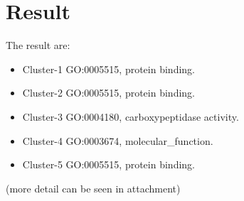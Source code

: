 \section{Result}

The result are:
\begin{itemize}
	\item Cluster-1 GO:0005515, protein binding.
	\item Cluster-2 GO:0005515, protein binding.
	\item Cluster-3 GO:0004180, carboxypeptidase activity.
	\item Cluster-4 GO:0003674, molecular\_function.
	\item Cluster-5 GO:0005515, protein binding.
\end{itemize}

(more detail can be seen in attachment)


